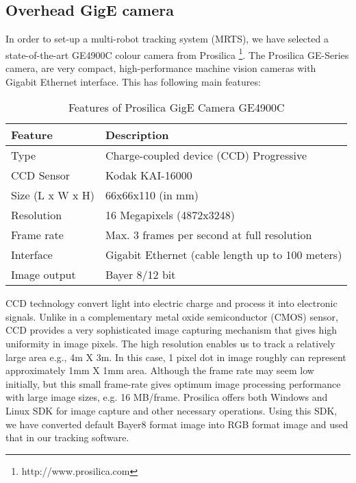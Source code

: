 \subsection{Overhead GigE camera}
In order to set-up a multi-robot tracking system (MRTS), we have selected a state-of-the-art GE4900C colour camera from Prosilica \footnote{http://www.prosilica.com}. The Prosilica GE-Series camera,  are very compact, high-performance machine vision cameras with Gigabit Ethernet interface. This has following main features:

\begin{table}
\caption{Features of Prosilica GigE Camera GE4900C}
\label{table:ge4900c}
\begin{center}
\begin{tabular}{|l||l|}
\hline \textbf{Feature} & \textbf{Description}\\
\hline Type & Charge-coupled device (CCD) Progressive\\
\hline CCD Sensor & Kodak KAI-16000\\
\hline Size (L x W x H) & 66x66x110  (in mm)\\
\hline Resolution & 16 Megapixels (4872x3248)\\ 
\hline Frame rate  & Max. 3 frames per second  at full resolution\\
\hline Interface & Gigabit Ethernet (cable length up to 100 meters)\\
\hline Image output & Bayer 8/12 bit\\
\hline
\end{tabular}
\end{center}
\end{table}

CCD technology convert light into electric charge and process it into electronic signals. Unlike in a complementary metal oxide semiconductor (CMOS) sensor,  CCD provides a very sophisticated image capturing mechanism that gives high uniformity in image pixels. The high resolution enables us to track a relatively large area e.g., 4m X 3m. In this case, 1 pixel dot in image roughly can represent approximately 1mm X 1mm area. Although the frame rate may seem low initially,  but this small frame-rate gives optimum image processing performance with large image sizes, e.g. 16 MB/frame. Prosilica offers both Windows and Linux SDK for image capture and other necessary operations. Using this SDK, we have converted default Bayer8 format image into RGB format  image and used that in our tracking software.
